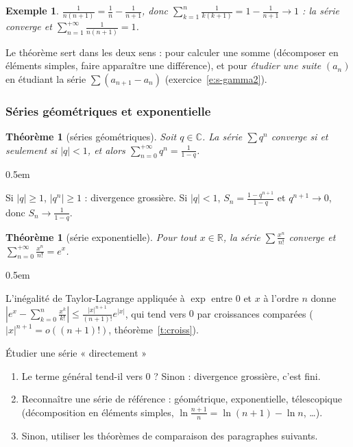 \documentclass[a4paper,11pt]{article}
\makeatletter
\numberwithin{equation}{section}
\numberwithin{figure}{section}
\numberwithin{table}{section}
\theoremstyle{enonce}
\newtheorem{theoreme}[definition]{Théorème}
\theoremstyle{exemple}
\newtheorem{exemple}[definition]{Exemple}
\theoremstyle{remarque}
\renewcommand{\proofname}{Démonstration}
\renewenvironment{proof}[1][\proofname]{\par\pushQED{\qed}\normalfont
  \topsep0.5em\relax\trivlist\item[\hskip\labelsep\sffamily\itshape\color{Gris}#1.]\ignorespaces}
  {\popQED\endtrivlist\@endpefalse}
\newcommand{\R}{\mathbb{R}}
\newcommand{\C}{\mathbb{C}}
\makeatother
\begin{document}
\begin{exemple}\label{x:tele}
$\frac1{n(n+1)}=\frac1n-\frac1{n+1}$, donc $\sum_{k=1}^n\frac1{k(k+1)}=1-\frac1{n+1}\to1$ : la série converge et
$\displaystyle\sum_{n=1}^{+\infty}\frac1{n(n+1)}=1$.
\end{exemple}

Le théorème sert dans les deux sens : pour calculer une somme (décomposer en éléments simples, faire apparaître une
différence), et pour \emph{étudier une suite} $(a_n)$ en étudiant la série $\sum(a_{n+1}-a_n)$ (exercice~\ref{e:s-gamma2}).

\subsubsection*{Séries géométriques et exponentielle}

\begin{theoreme}[séries géométriques]\label{t:geom}
Soit $q\in\C$. La série $\sum q^n$ converge si et seulement si $|q|<1$, et alors $\displaystyle\sum_{n=0}^{+\infty}q^n=\frac1{1-q}$.
\end{theoreme}

\begin{proof}
Si $|q|\geq1$, $|q^n|\geq1$ : divergence grossière. Si $|q|<1$, $S_n=\frac{1-q^{n+1}}{1-q}$ et $q^{n+1}\to0$, donc
$S_n\to\frac1{1-q}$.
\end{proof}

\begin{theoreme}[série exponentielle]\label{t:exp}
Pour tout $x\in\R$, la série $\sum\frac{x^n}{n!}$ converge et $\displaystyle\sum_{n=0}^{+\infty}\frac{x^n}{n!}=e^x$.
\end{theoreme}

\begin{proof}
L'inégalité de Taylor-Lagrange appliquée à $\exp$ entre $0$ et $x$ à l'ordre $n$ donne
$\left|e^x-\sum_{k=0}^n\frac{x^k}{k!}\right|\leq\frac{|x|^{n+1}}{(n+1)!}e^{|x|}$, qui tend vers $0$ par croissances comparées
($|x|^{n+1}=o((n+1)!)$, théorème~\ref{t:croiss}).
\end{proof}

\begin{methode}{Étudier une série « directement »}\label{m:directe}
\begin{enumerate}
\item Le terme général tend-il vers $0$ ? Sinon : divergence grossière, c'est fini.
\item Reconnaître une série de référence : géométrique, exponentielle, télescopique (décomposition en éléments simples,
$\ln\frac{n+1}n=\ln(n+1)-\ln n$, \dots).
\item Sinon, utiliser les théorèmes de comparaison des paragraphes suivants.
\end{enumerate}
\end{methode}
\end{document}
